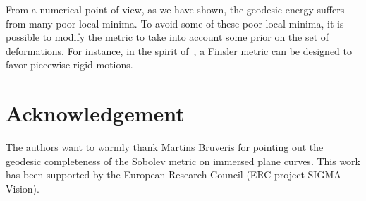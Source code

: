 From a numerical point of view, as we have shown, the  geodesic energy suffers from many poor local minima. To avoid some of these poor local minima, it is possible to modify the metric to take into account some prior on the set of deformations. For instance, in the spirit of~\cite{Rigid-evol}, a Finsler metric can be designed to favor piecewise rigid motions.

\section*{Acknowledgement}

The authors want to warmly thank Martins Bruveris for pointing out the geodesic completeness of the Sobolev metric on immersed plane curves. This work has been supported by the European Research Council (ERC project SIGMA-Vision).
